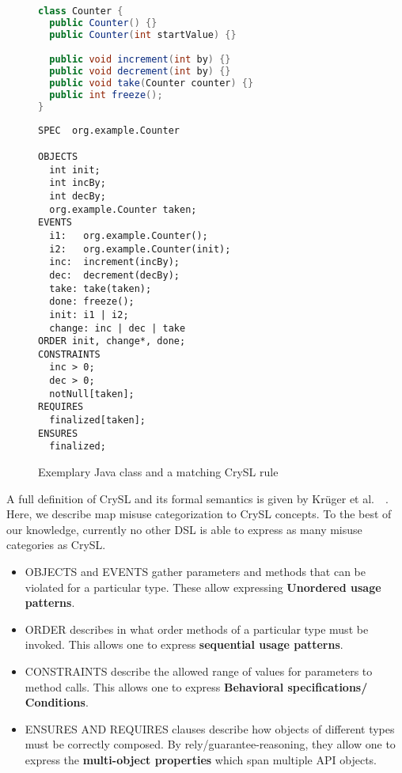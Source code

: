 \documentclass{article}
\newcommand{\etal}{et al.\ }
\begin{document}
\begin{figure}[t]
  \begin{minipage}[t]{0.5\textwidth}
\begin{lstlisting}[language=Java]
class Counter {
  public Counter() {}
  public Counter(int startValue) {}

  public void increment(int by) {}
  public void decrement(int by) {}
  public void take(Counter counter) {}
  public int freeze();
}
\end{lstlisting}
\end{minipage}
\begin{minipage}[t]{0.5\textwidth}
\begin{lstlisting}[language=CrySL]
SPEC  org.example.Counter

OBJECTS
  int init;
  int incBy;
  int decBy;
  org.example.Counter taken;
EVENTS
  i1:   org.example.Counter();
  i2:   org.example.Counter(init);
  inc:  increment(incBy);
  dec:  decrement(decBy);
  take: take(taken);
  done: freeze();
  init: i1 | i2;
  change: inc | dec | take
ORDER init, change*, done;
CONSTRAINTS
  inc > 0;
  dec > 0;
  notNull[taken];
REQUIRES
  finalized[taken];
ENSURES
  finalized;
\end{lstlisting}
\end{minipage}
\caption{Exemplary Java class and a matching CrySL rule}
\label{fig:CrySL:JavaExample}
\end{figure}


A full definition of CrySL and its formal semantics is given by Krüger \etal~\cite{CrySL}. Here, we describe map misuse categorization to CrySL concepts.  To the best of our knowledge, currently no other DSL is able to express as many misuse categories as CrySL. 
\begin{itemize}
\item OBJECTS and EVENTS gather parameters and methods that can be violated for a particular type. These allow expressing \textbf{Unordered usage patterns}.
\item ORDER describes in what order methods of a particular type must be invoked. This allows one to express \textbf{sequential usage patterns}.
\item CONSTRAINTS describe the allowed range of values for parameters to method calls. This allows one to express \textbf{Behavioral specifications/ Conditions}.
\item ENSURES AND REQUIRES clauses describe how objects of different types must be correctly composed. By rely/guarantee-reasoning, they allow one to express the \textbf{multi-object properties} which span multiple API objects. 
\end{itemize}
\label{sec:expressiveness}
\end{document}
